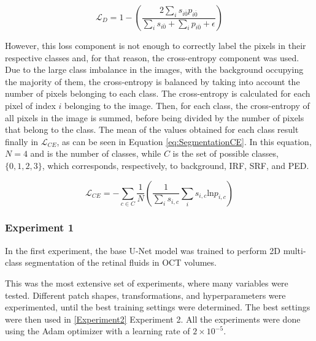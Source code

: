 \begin{equation}
	\mathcal{L}_{D} = 1 - \left( \frac{2 \sum_{i} s_{i\overline{0}} p_{i\overline{0}}}{\sum_{i} s_{i\overline{0}} + \sum_{i} p_{i\overline{0}} + \epsilon} \right)
	\label{eq:SegmentationDice}
\end{equation}

However, this loss component is not enough to correctly label the pixels in their respective classes and, for that reason, the cross-entropy component was used. Due to the large class imbalance in the images, with the background occupying the majority of them, the cross-entropy is balanced by taking into account the number of pixels belonging to each class. The cross-entropy is calculated for each pixel of index $i$ belonging to the image. Then, for each class, the cross-entropy of all pixels in the image is summed, before being divided by the number of pixels that belong to the class. The mean of the values obtained for each class result finally in $\mathcal{L}_{CE}$, as can be seen in Equation \ref{eq:SegmentationCE}. In this equation, $N=4$ and is the number of classes, while $C$ is the set of possible classes, $\{0,1,2,3\}$, which corresponds, respectively, to background, IRF, SRF, and PED.

\begin{equation}
	\mathcal{L}_{CE} = - \sum_{c \in C} \frac{1}{N}\left( \frac{1}{\sum_{i} s_{i,c}} \sum_{i} s_{i,c} \text{ln} p_{i,c} \right)
	\label{eq:SegmentationCE}
\end{equation}

\subsubsection{Experiment 1}\label{Experiment1}
In the first experiment, the base U-Net model was trained to perform 2D multi-class segmentation of the retinal fluids in OCT volumes.
\par
This was the most extensive set of experiments, where many variables were tested. Different patch shapes, transformations, and hyperparameters were experimented, until the best training settings were determined. The best settings were then used in \ref{Experiment2} Experiment 2. All the experiments were done using the Adam optimizer \parencite{Kingma2017} with a learning rate of $2 \times 10^{-5}$.


